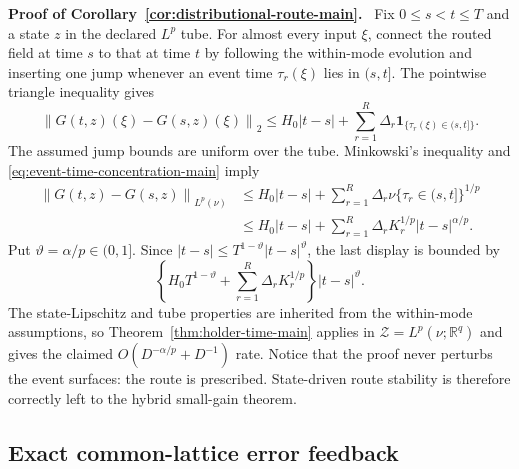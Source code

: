 \documentclass[twoside,11pt]{article}
\renewenvironment{proof}[1][Proof]{\par\noindent\textbf{#1.}\ }{\hfill\BlackBox\par\medskip}
\newcommand{\Z}{\mathcal{Z}}
\newcommand{\norm}[1]{\left\lVert #1\right\rVert}
\newcommand{\one}{\mathbf{1}}
\begin{document}
\begin{proof}[Proof of Corollary~\ref{cor:distributional-route-main}]
Fix $0\le s<t\le T$ and a state $z$ in the declared $L^p$ tube.  For almost
every input $\xi$, connect the routed field at time $s$ to that at time $t$ by
following the within-mode evolution and inserting one jump whenever an event
time $\tau_r(\xi)$ lies in $(s,t]$.  The pointwise triangle inequality gives
\begin{equation}
 \norm{G(t,z)(\xi)-G(s,z)(\xi)}_2
 \le H_0|t-s|
      +\sum_{r=1}^R\Delta_r
       \one_{\{\tau_r(\xi)\in(s,t]\}}.
 \label{eq:app-route-pointwise}
\end{equation}
The assumed jump bounds are uniform over the tube.  Minkowski's inequality and
\eqref{eq:event-time-concentration-main} imply
\begin{align}
 \norm{G(t,z)-G(s,z)}_{L^p(\nu)}
 &\le H_0|t-s|
   +\sum_{r=1}^R\Delta_r
      \nu\{\tau_r\in(s,t]\}^{1/p}\nonumber\\
 &\le H_0|t-s|
   +\sum_{r=1}^R\Delta_rK_r^{1/p}|t-s|^{\alpha/p}.
 \label{eq:app-route-lp}
\end{align}
Put $\vartheta=\alpha/p\in(0,1]$.  Since
$|t-s|\le T^{1-\vartheta}|t-s|^\vartheta$, the last display is bounded by
\begin{equation}
 \left\{H_0T^{1-\vartheta}
        +\sum_{r=1}^R\Delta_rK_r^{1/p}\right\}|t-s|^\vartheta.
 \label{eq:app-route-holder}
\end{equation}
The state-Lipschitz and tube properties are inherited from the within-mode
assumptions, so Theorem~\ref{thm:holder-time-main} applies in
$\Z=L^p(\nu;\mathbb R^q)$ and gives the claimed
$O(D^{-\alpha/p}+D^{-1})$ rate.  Notice that the proof never perturbs the
event surfaces: the route is prescribed.  State-driven route stability is
therefore correctly left to the hybrid small-gain theorem.
\end{proof}

\subsection{Exact common-lattice error feedback}
\label{app:common-lattice-proof}
\end{document}
